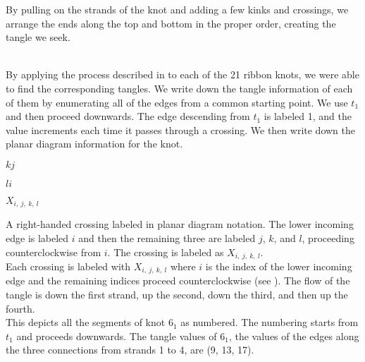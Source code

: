 \begin{paper}
By pulling on the strands of the knot and adding a few kinks and crossings, we
arrange the ends along the top and bottom in the proper order, creating the
tangle we seek.\\

\\


By applying the process described in \thmRibbon to each of the 21 ribbon knots,
we were able to find the corresponding tangles.
We write down the tangle information of each of them by enumerating all of the
edges from a common starting point.
We use $t_1$ and then proceed downwards.
The edge descending from $t_1$ is labeled 1, and the value increments each time
it passes through a crossing.
We then write down the planar diagram information for the knot.\\

{\hspace{0.3in}\hspace{0.275\columnwidth}$k$\hspace{0.2\columnwidth}$j$
\vspace{-0.5em}\begin{center}\end{center}
\vspace{-0.5em}
\hspace{0.3in}\hspace{0.275\columnwidth}$l$\hspace{0.2\columnwidth}$i$

\hspace{0.3in}\hspace{0.31\columnwidth}$X_{i,~j,~k,~l}$}
{A right-handed crossing labeled in planar diagram notation.
The lower incoming edge is labeled $i$ and then the remaining three are
labeled $j$, $k$, and $l$, proceeding counterclockwise from $i$.
The crossing is labeled as $X_{i,~j,~k,~l}$.}\\

Each crossing is labeled with $X_{i,~j,~k,~l}$ where $i$ is the index of the
lower incoming edge and the remaining indices proceed counterclockwise (see
\figCrossing).
The flow of the tangle is down the first strand, up the second, down the third,
and then up the fourth.\\

{This depicts all the segments of knot $6_1$ as numbered.
The numbering starts from $t_1$ and proceeds downwards.
The tangle values of $6_1$, the values of the edges along the three connections
from strands 1 to 4, are (9, 13, 17).}\\


\end{paper}
